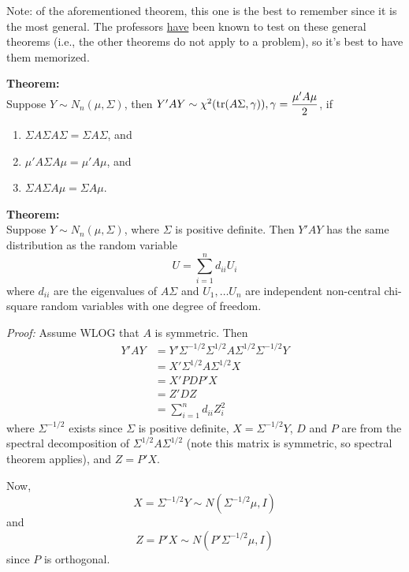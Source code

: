 \documentclass[12pt]{article}
\newcommand{\sumn}{\sum_{i=1}^n}
\numberwithin{equation}{section}
\begin{document}
Note: of the aforementioned theorem, this one is the best to remember since it is the most general. The professors \underline{have} been known to test on these general theorems (i.e., the other theorems do not apply to a problem), so it's best to have them memorized.

\textbf{Theorem:} \\
Suppose $Y \sim N_n(\mu, \Sigma)$, then $Y'AY \sim \chi^2(\tr(A\Sigma, \gamma)), \gamma = \dfrac{\mu' A \mu}{2}$, if
\begin{enumerate}
  \item $\Sigma A \Sigma A \Sigma = \Sigma A \Sigma$, and
  \item $\mu'A \Sigma A \mu = \mu' A \mu$, and
  \item $\Sigma A \Sigma A \mu = \Sigma A \mu$.
\end{enumerate}

\textbf{Theorem:} \\
Suppose $Y \sim N_n(\mu, \Sigma)$, where $\Sigma$ is positive definite. Then $Y'AY$ has the same distribution as the random variable
\begin{equation*}
  U = \sumn d_{ii}U_i
\end{equation*}
where $d_{ii}$ are the eigenvalues of $A\Sigma$ and $U_1, \ldots U_n$ are independent non-central chi-square random variables with one degree of freedom.

\textit{Proof:}
Assume WLOG that $A$ is symmetric. Then
\begin{align*}
  Y'AY &= Y'\Sigma^{-1/2} \Sigma^{1/2} A \Sigma^{1/2} \Sigma^{-1/2} Y \\
    &= X'\Sigma^{1/2} A \Sigma^{1/2} X \\
    &= X' P D P' X \\
    &= Z' D Z \\
    &= \sumn d_{ii} Z_i^2
\end{align*}
%
where $\Sigma^{-1/2}$ exists since $\Sigma$ is positive definite,
$X = \Sigma^{-1/2} Y$, $D$ and $P$ are from the spectral decomposition of $\Sigma^{1/2} A \Sigma^{1/2}$ (note this matrix is symmetric, so spectral theorem applies), and $Z = P'X$.

Now,
\begin{equation*}
  X = \Sigma^{-1/2} Y \sim N(\Sigma^{-1/2} \mu, I)
\end{equation*}
and
\begin{equation*}
  Z = P'X \sim N(P' \Sigma^{-1/2} \mu, I)
\end{equation*}
since $P$ is orthogonal.
\end{document}
